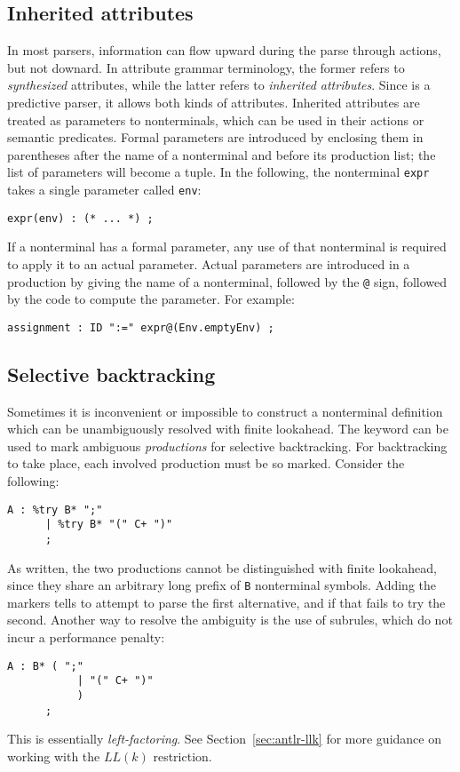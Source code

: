 \subsection{Inherited attributes}\label{sec:inh-attr}

In most parsers, information can flow upward during the parse through actions, but not downard.  In attribute grammar terminology, the former refers to \emph{synthesized} attributes, while the latter refers to \emph{inherited attributes}.  Since \antlr{} is a predictive parser, it allows both kinds of attributes.  Inherited attributes are treated as parameters to nonterminals, which can be used in their actions or semantic predicates.  Formal parameters are introduced by enclosing them in parentheses after the name of a nonterminal and before its production list; the list of parameters will become a tuple.  In the following, the nonterminal \texttt{expr} takes a single parameter called \texttt{env}:
\begin{lstlisting}[language=MLAntlr]
    expr(env) : (* ... *) ;
\end{lstlisting}%
If a nonterminal has a formal parameter, any use of that nonterminal is required to apply it to an actual parameter.  Actual parameters are introduced in a production by giving the name of a nonterminal, followed by the \texttt{@} sign, followed by the code to compute the parameter.  For example:
\begin{lstlisting}[language=MLAntlr]
    assignment : ID ":=" expr@(Env.emptyEnv) ;
\end{lstlisting}%

\subsection{Selective backtracking}

Sometimes it is inconvenient or impossible to construct a nonterminal definition which can be unambiguously resolved with finite lookahead.
The  keyword can be used to mark ambiguous \emph{productions} for selective backtracking.  For backtracking to take place, each involved production must be so marked.  Consider the following:
\begin{lstlisting}[language=MLAntlr]
    A : %try B* ";"
      | %try B* "(" C+ ")"
      ;
\end{lstlisting}%
As written, the two productions cannot be distinguished with finite lookahead, since they share an arbitrary long prefix of \texttt{B} nonterminal symbols.  Adding the  markers tells \antlr{} to attempt to parse the first alternative, and if that fails to try the second.  Another way to resolve the ambiguity is the use of subrules, which do not incur a performance penalty:
\begin{lstlisting}[language=MLAntlr]
    A : B* ( ";"
           | "(" C+ ")"
           )
      ;
\end{lstlisting}%
This is essentially \emph{left-factoring}. See Section~\ref{sec:antlr-llk} for more guidance on working with the $LL(k)$ restriction.

